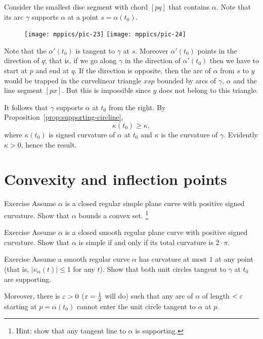 Consider the smallest disc segment with chord $[pq]$ that contains $\alpha$.
Note that its arc $\gamma$ supports $\alpha$ at a point $s=\alpha(t_0)$.

\begin{wrapfigure}{R}{50 mm}
\centering
\texttt{[image: mppics/pic-23]}
\bigskip
\texttt{[image: mppics/pic-24]}
\vskip0mm
\end{wrapfigure}

Note that the $\alpha'(t_0)$ is tangent to $\gamma$ at $s$.
Moreover $\alpha'(t_0)$ points in the direction of $q$;
that is, if we go along $\gamma$ in the direction  of $\alpha'(t_0)$ then we have to start at $p$ and end at $q$.
If the direction is opposite, then the arc of $\alpha$ from $s$ to $y$ would be trapped in the curvelinear triangle $xsp$ bounded by arcs of $\gamma$, $\alpha$ and the line segment $[px]$.
But this is impossible since $y$ does not belong to this triangle.



It follows that $\gamma$ supports $\alpha$ at $t_0$ from the right.
By Proposition~\ref{prop:supporting-circline}, 
\[\kappa(t_0)\ge \kappa,\]
where $\kappa(t_0)$ is signed curvature of $\alpha$ at $t_0$ and $\kappa$ is the curvature of $\gamma$.
Evidently $\kappa>0$, hence the result.
\qeds

\section{Convexity and inflection points}

\begin{thm}{Exercise}
Assume $\alpha$ is a closed regular simple plane curve with positive signed curvature.
Show that $\alpha$ bounds a convex set.%
\footnote{Hint: show that any tangent line to $\alpha$ is supporting.}
\end{thm}

\begin{thm}{Exercise}\label{ex:convex+2pi}
Assume $\alpha$ is a closed smooth regular plane curve with positive signed curvature.
Show that $\alpha$ is simple if and only if its total curvature is $2\cdot\pi$. 
\end{thm}


\begin{thm}{Exercise}\label{ex:1-supporting} Assume a smooth regular curve $\alpha$ has curvature at most $1$ at any point (that is, $|\kappa_\alpha(t)|\le 1$ for any $t$).
Show that both unit circles tangent to $\gamma$ at $t_0$ are supporting.

Moreover, there is $\varepsilon>0$ ($\varepsilon=\tfrac12$ will do) such that any arc of $\alpha$ of length $<\varepsilon$ starting at $p=\alpha(t_0)$ cannot enter the unit circle tangent to $\alpha$ at $p$.  
\end{thm}



